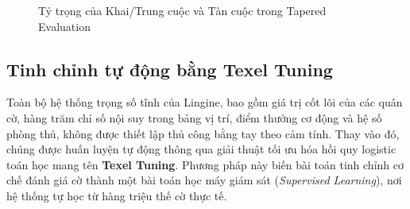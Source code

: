 \begin{figure}[htbp]
    \centering
    \caption{Tỷ trọng của Khai/Trung cuộc và Tàn cuộc trong Tapered Evaluation}
    \label{fig:tapered_eval}
\end{figure}

\subsection{Tinh chỉnh tự động bằng Texel Tuning}

Toàn bộ hệ thống trọng số tĩnh của Lingine, bao gồm giá trị cốt lõi của các quân cờ, hàng trăm chỉ số nội suy trong bảng vị trí, điểm thưởng cơ động và hệ số phòng thủ, không được thiết lập thủ công bằng tay theo cảm tính. Thay vào đó, chúng được huấn luyện tự động thông qua giải thuật tối ưu hóa hồi quy logistic toán học mang tên \textbf{Texel Tuning}. Phương pháp này biến bài toán tinh chỉnh cơ chế đánh giá cờ thành một bài toán học máy giám sát (\textit{Supervised Learning}), nơi hệ thống tự học từ hàng triệu thế cờ thực tế.

